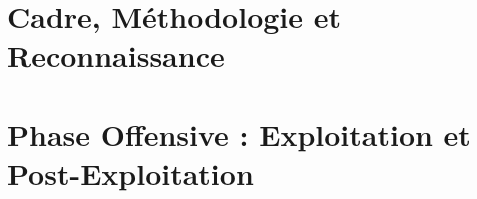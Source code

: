 \documentclass[12pt, a4paper, twoside, openright]{book}
\begin{document}
\lstlistoflistings
{}

\mainmatter



\part{Cadre, Méthodologie et Reconnaissance}









\part{Phase Offensive : Exploitation et Post-Exploitation}







\end{document}
